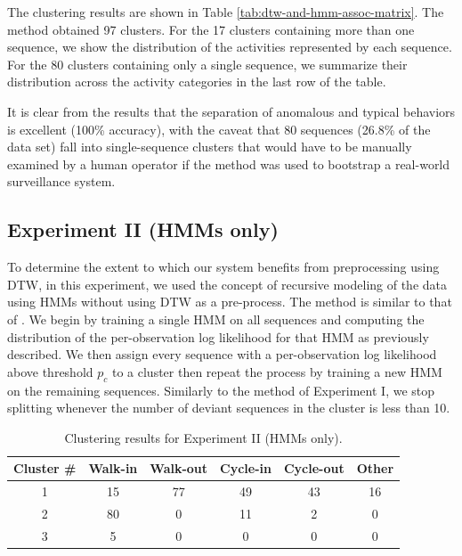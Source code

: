 The clustering results are shown in
Table \ref{tab:dtw-and-hmm-assoc-matrix}. The method obtained 97
clusters. For the 17 clusters containing more than one sequence, we
show the distribution of the activities represented by each
sequence. For the 80 clusters containing only a single sequence, we
summarize their distribution across the activity categories in the
last row of the table.

It is clear from the results that the separation of anomalous and
typical behaviors is excellent (100\% accuracy), with the caveat that
80 sequences (26.8\% of the data set) fall into single-sequence
clusters that would have to be manually examined by a human operator
if the method was used to bootstrap a real-world surveillance system.

\subsection{Experiment II (HMMs only)}

To determine the extent to which our system benefits from
preprocessing using DTW, in this experiment, we used the concept of
recursive modeling of the data using HMMs without using DTW as a
pre-process.  The method is similar to that
of .  We begin by training a single HMM
on all sequences and computing the distribution of the per-observation
log likelihood for that HMM as previously described.  We then assign
every sequence with a per-observation log likelihood above threshold
$p_c$ to a cluster then repeat the process by training a new HMM on
the remaining sequences.  Similarly to the method of Experiment I, we
stop splitting whenever the number of deviant sequences in the cluster
is less than 10.

\begin{table}[t]
  \caption[Clustering results for Experiment II (HMMs only).]{\small
    Clustering results for Experiment II (HMMs only).}
  \label{tab:hmm-assoc-matrix}
  \begin{center}
    \begin{tabular}{c|c|c|c|c|c}
      \hline
      Cluster \# & Walk-in & Walk-out & Cycle-in & Cycle-out & Other \\ 
      \hline \hline
      1 & 15 & 77 & 49 & 43 & 16 \\ \hline
      2 & 80 & 0 & 11 & 2 & 0 \\ \hline	
      3 & 5 & 0 & 0 & 0 & 0 \\ \hline	
    \end{tabular}
  \end{center}
\end{table}

